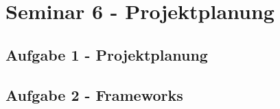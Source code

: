 
\section{Seminar 6 - Projektplanung}

	\subsection{Aufgabe 1 - Projektplanung}
	
	\subsection{Aufgabe 2 - Frameworks}
	
